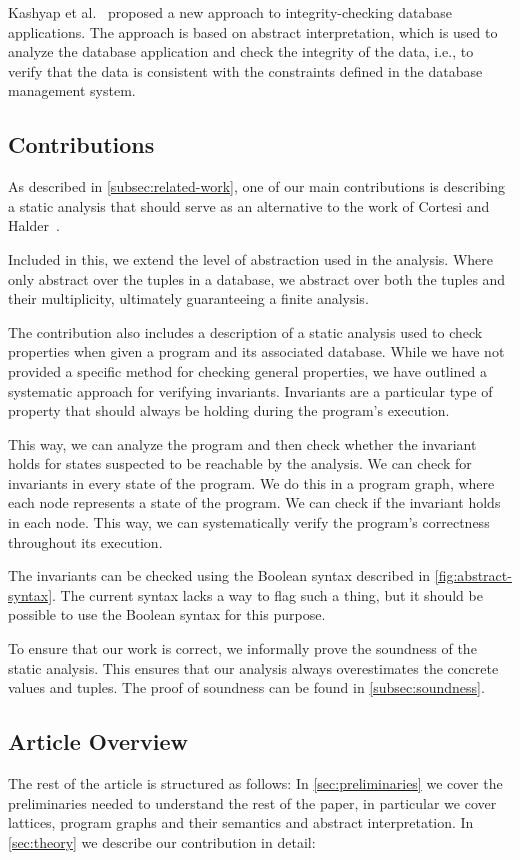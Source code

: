 Kashyap et al.~\cite{kashyap_integrity_2022} proposed a new approach to integrity-checking database applications.
The approach is based on abstract interpretation, which is used to analyze the database application and check the integrity of the data, i.e., to verify that the data is consistent with the constraints defined in the database management system.


\subsection{Contributions}\label{subsec:contributions}
As described in \autoref{subsec:related-work}, one of our main contributions is describing a static analysis that should serve as an alternative to the work of Cortesi and Halder~\cite{halder_abstract_2012}.

Included in this, we extend the level of abstraction used in the analysis.
Where~\cite{halder_abstract_2012} only abstract over the tuples in a database, we abstract over both the tuples and their multiplicity, ultimately guaranteeing a finite analysis.

The contribution also includes a description of a static analysis used to check properties when given a program and its associated database.
While we have not provided a specific method for checking general properties, we have outlined a systematic approach for verifying invariants.
Invariants are a particular type of property that should always be holding during the program's execution.

This way, we can analyze the program and then check whether the invariant holds for states suspected to be reachable by the analysis.
We can check for invariants in every state of the program.
We do this in a program graph, where each node represents a state of the program.
We can check if the invariant holds in each node.
This way, we can systematically verify the program's correctness throughout its execution.

The invariants can be checked using the Boolean syntax described in \autoref{fig:abstract-syntax}.
The current syntax lacks a way to flag such a thing, but it should be possible to use the Boolean syntax for this purpose.

To ensure that our work is correct, we informally prove the soundness of the static analysis.
This ensures that our analysis always overestimates the concrete values and tuples.
The proof of soundness can be found in \autoref{subsec:soundness}.

\subsection{Article Overview}\label{subsec:article-overview}
The rest of the article is structured as follows:
In \autoref{sec:preliminaries} we cover the preliminaries needed to understand the rest of the paper, in particular we cover lattices, program graphs and their semantics and abstract interpretation.
In \autoref{sec:theory} we describe our contribution in detail:

